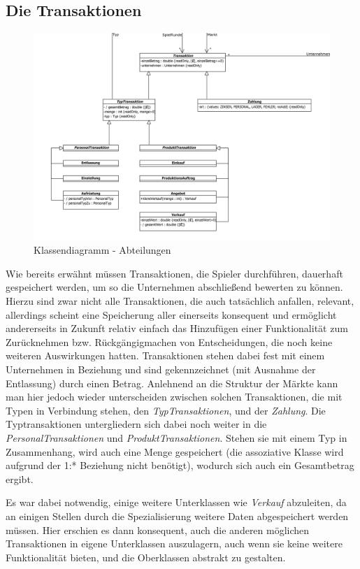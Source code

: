 \subsection{Die Transaktionen}
\begin{figure}[ht]
     \centering
     \includegraphics[width=\textwidth]{30_Fachkonzept/20_Entwurf/transaktion}
     \caption{Klassendiagramm - Abteilungen}
     \label{img:fachkonzept-entwurf-abteilung}
\end{figure}
Wie bereits erwähnt müssen Transaktionen, die Spieler durchführen, dauerhaft gespeichert werden, um so die Unternehmen abschließend bewerten zu können. Hierzu sind zwar nicht alle Transaktionen, die auch tatsächlich anfallen, relevant, allerdings scheint eine Speicherung aller einerseits konsequent und ermöglicht andererseits in Zukunft relativ einfach das Hinzufügen einer Funktionalität zum Zurücknehmen bzw. Rückgängigmachen von Entscheidungen, die noch keine weiteren Auswirkungen hatten. Transaktionen stehen dabei fest mit einem Unternehmen in Beziehung und sind gekennzeichnet (mit Ausnahme der Entlassung) durch einen Betrag. Anlehnend an die Struktur der Märkte kann man hier jedoch wieder unterscheiden zwischen solchen Transaktionen, die mit Typen in Verbindung stehen, den \textit{TypTransaktionen}, und der \textit{Zahlung}. Die Typtransaktionen untergliedern sich dabei noch weiter in die \textit{PersonalTransaktionen} und \textit{ProduktTransaktionen}. Stehen sie mit einem Typ in Zusammenhang, wird auch eine Menge gespeichert (die assoziative Klasse wird aufgrund der 1:* Beziehung nicht benötigt), wodurch sich auch ein Gesamtbetrag ergibt.

Es war dabei notwendig, einige weitere Unterklassen wie \textit{Verkauf} abzuleiten, da an einigen Stellen durch die Spezialisierung weitere Daten abgespeichert werden müssen. Hier erschien es dann konsequent, auch die anderen möglichen Transaktionen in eigene Unterklassen auszulagern, auch wenn sie keine weitere Funktionalität bieten, und die Oberklassen abstrakt zu gestalten.

